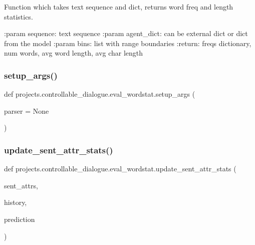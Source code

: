 \begin{DoxyVerb}Function which takes text sequence and dict, returns word freq and length
statistics.

:param sequence: text sequence
:param agent_dict: can be external dict or dict from the model
:param bins: list with range boundaries
:return: freqs dictionary, num words, avg word length, avg char length
\end{DoxyVerb}
 \mbox{\label{namespaceprojects_1_1controllable__dialogue_1_1eval__wordstat_aa40ff30af74bd5824589612828146ec8}} 
\subsubsection{\texorpdfstring{setup\+\_\+args()}{setup\_args()}}
{\footnotesize\ttfamily def projects.\+controllable\+\_\+dialogue.\+eval\+\_\+wordstat.\+setup\+\_\+args (\begin{DoxyParamCaption}\item[{}]{parser = {\ttfamily None} }\end{DoxyParamCaption})}

\mbox{\label{namespaceprojects_1_1controllable__dialogue_1_1eval__wordstat_a1bc3cda7d486add0d740338df4688622}} 
\subsubsection{\texorpdfstring{update\+\_\+sent\+\_\+attr\+\_\+stats()}{update\_sent\_attr\_stats()}}
{\footnotesize\ttfamily def projects.\+controllable\+\_\+dialogue.\+eval\+\_\+wordstat.\+update\+\_\+sent\+\_\+attr\+\_\+stats (\begin{DoxyParamCaption}\item[{}]{sent\+\_\+attrs,  }\item[{}]{history,  }\item[{}]{prediction }\end{DoxyParamCaption})}

